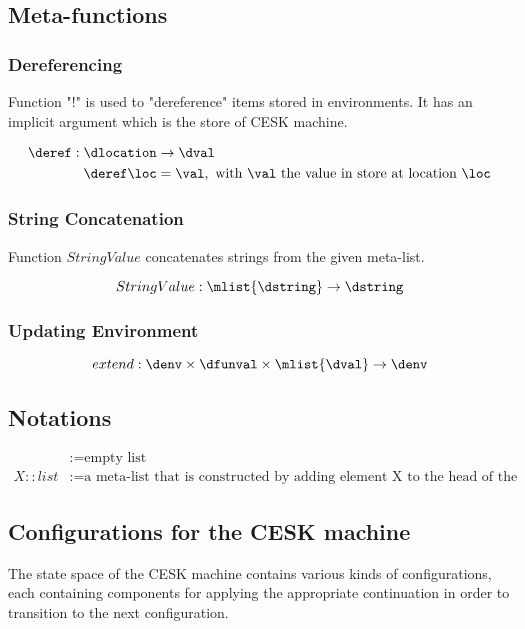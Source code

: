 \documentclass{article}
\begin{document}
\subsection{Meta-functions}
\label{subsec:meta-functions}
\subsubsection{Dereferencing}
\label{subsubsection:dereferecing}
Function "!" is used to "dereference" items stored in environments. It has an implicit argument which is the store of CESK machine.

\begin{align*}
\deref : \dlocation &\rightarrow \dval \\
\deref\loc &=  \val, \textrm{ with $\val$ the value in store at location } \loc
\end{align*}

\subsubsection{String Concatenation}
\label{subsubsec:string-concatenation}
Function $StringValue$ concatenates strings from the given meta-list.

\[StringValue : \mlist{\dstring} \rightarrow \dstring\]

\subsubsection{Updating Environment}
\label{subsubsec:updating-env}

\[extend : \denv \times \dfunval \times \mlist{\dval} \rightarrow  \denv \]

\subsection{Notations}
\label{subsec:notations}

\begin{align*}
[]	&:= \textrm{empty list} \\
X :: list	&:= \textrm{a meta-list that is constructed by adding element X to the head of the meta-list list}
\end{align*}

\subsection{Configurations for the CESK machine}
\label{subsec:cesk-configs}
The state space of the CESK machine contains various kinds of configurations, each containing components for applying the appropriate continuation in order to transition to the next configuration. 
\end{document}
